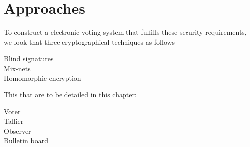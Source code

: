 \section{Approaches}
To construct a electronic voting system that fulfills these security requirements, we look that three cryptographical techniques as follows 

\begin{description}
    \item[Blind signatures]

    \item[Mix-nets]        
        
    \item[Homomorphic encryption]
\end{description}

This that are to be detailed in this chapter: 

\begin{description}
    \item[Voter]
    \item[Tallier]
    \item[Observer]
    \item[Bulletin board]
\end{description}